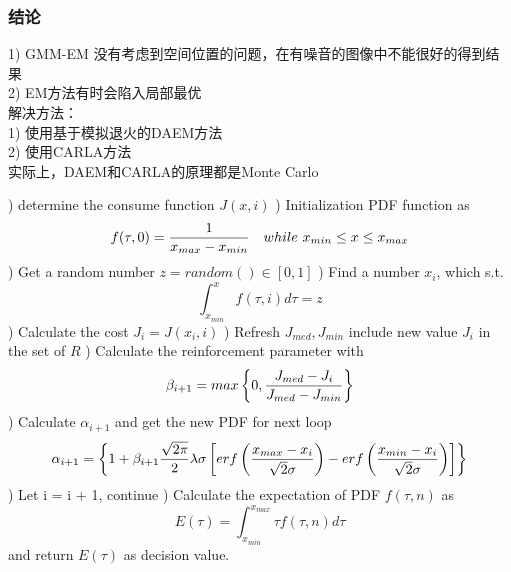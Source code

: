 \documentclass[notheorems, UTF8]{beamer}
\theoremstyle{plain}
\begin{document}
\begin{frame}
\frametitle{结论}
1) GMM-EM 没有考虑到空间位置的问题，在有噪音的图像中不能很好的得到结果\\
2) EM方法有时会陷入局部最优\\

解决方法：\\
1) 使用基于模拟退火的DAEM方法\\
2) 使用CARLA方法\\
实际上，DAEM和CARLA的原理都是Monte Carlo
\end{frame}



\begin{frame}

\begin{algorithm}[H]
\tiny
\begin{algorithmic}
) determine the consume function $J(x, i)$
) Initialization PDF function as 
\begin{displaymath}
f(\tau, 0) = {1 \over x_{max} - x_{min}}\ \ \ while\  x_{min} \leq x \leq x_{max}
\end{displaymath}
) Get a random number $z = random() \in [0, 1]$
) Find a number $x_i$, which s.t.
\begin{displaymath}
\int_{x_{min}}^{x} f(\tau, i) d\tau = z
\end{displaymath}
) Calculate the cost $J_i = J(x_i, i)$
) Refresh $J_{med}, J_{min}$ include new value $J_i$ in the set of $R$
) Calculate the reinforcement parameter with
\begin{displaymath}
\beta_{i+1} = max\left\{0, {J_{med} - J_i \over J_{med} - J_{min}}\right\}
\end{displaymath}
) Calculate $\alpha_{i+1}$ and get the new PDF for next loop
\begin{displaymath}
\alpha_{i+1} = \left\{1 + \beta_{i+1} {\sqrt{2\pi} \over 2} \lambda \sigma \left[erf\left({x_{max} - x_i \over \sqrt{2} \sigma} \right) - erf\left({x_{min} - x_i \over \sqrt{2} \sigma} \right)\right]\right\}
\end{displaymath}
) Let i = i + 1, continue
\EndWhile
{}) Calculate the expectation of PDF $f(\tau, n)$ as 
\begin{displaymath}
E(\tau) = \int_{x_{min}}^{x_{max}} \tau f(\tau, n) d\tau
\end{displaymath}
and return $E(\tau)$ as decision value.
\end{algorithmic}
\end{algorithm}
\end{frame}
\end{document}
